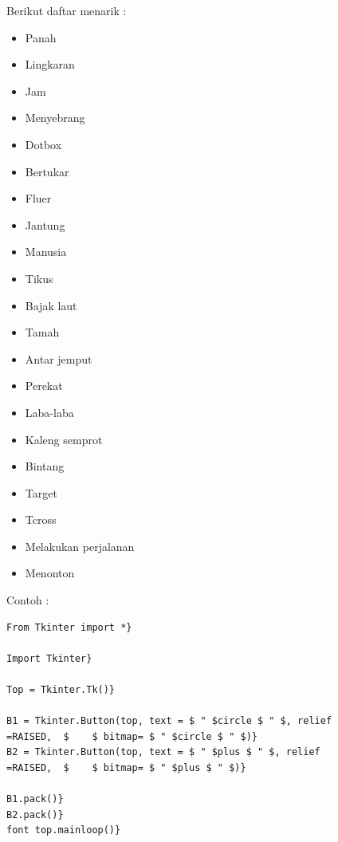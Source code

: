 \vspace{12pt}
Berikut daftar menarik : 
 
\begin{itemize}
\item Panah 
 
\item Lingkaran 
 
\item Jam 
 
\item Menyebrang 
 
\item Dotbox 
 
\item Bertukar 
 
\item Fluer 
 
\item Jantung 
 
\item Manusia 
 
\item Tikus 
 
\item Bajak laut 
 
\item Tamah 
 
\item Antar jemput 
 
\item Perekat 
 
\item Laba-laba 
 
\item Kaleng semprot 
 
\item Bintang 
 
\item Target 
 
\item Tcross 
 
\item Melakukan perjalanan 
 
\item Menonton
\end{itemize}
 
\vspace{12pt}
Contoh : 
\begin{verbatim}
From Tkinter import *} 

Import Tkinter} 

Top = Tkinter.Tk()} 

B1 = Tkinter.Button(top, text = $ " $circle $ " $, relief
=RAISED,  $    $ bitmap= $ " $circle $ " $)} 
B2 = Tkinter.Button(top, text = $ " $plus $ " $, relief
=RAISED,  $    $ bitmap= $ " $plus $ " $)} 

B1.pack()} 
B2.pack()} 
font top.mainloop()} 
\end{verbatim}

